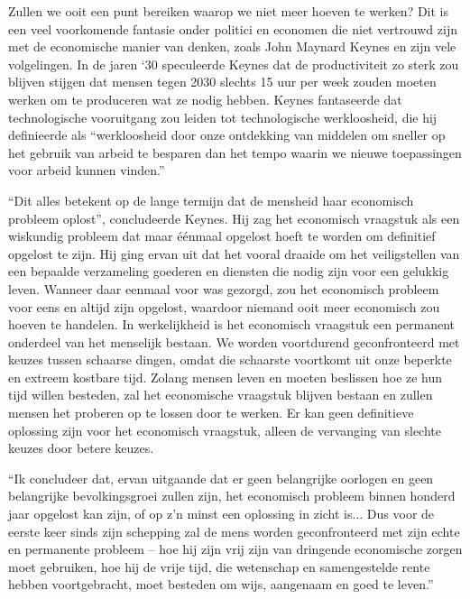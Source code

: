 Zullen we ooit een punt bereiken waarop we niet meer hoeven te werken?
Dit is een veel voorkomende fantasie onder politici en economen die niet
vertrouwd zijn met de economische manier van denken, zoals John Maynard
Keynes en zijn vele volgelingen. In de jaren `30 speculeerde Keynes dat
de productiviteit zo sterk zou blijven stijgen dat mensen tegen 2030
slechts 15 uur per week zouden moeten werken om te produceren wat ze
nodig hebben. Keynes fantaseerde dat technologische vooruitgang zou
leiden tot technologische werkloosheid, die hij definieerde als
\enquote{werkloosheid door onze ontdekking van middelen om sneller op het
gebruik van arbeid te besparen dan het tempo waarin we nieuwe
toepassingen voor arbeid kunnen vinden.}\autocite{43}

\enquote{Dit alles betekent op de lange termijn dat de mensheid haar economisch
probleem oplost}, concludeerde Keynes. Hij zag het economisch vraagstuk
als een wiskundig probleem dat maar éénmaal opgelost hoeft te worden om
definitief opgelost te zijn. Hij ging ervan uit dat het vooral draaide
om het veiligstellen van een bepaalde verzameling goederen en diensten
die nodig zijn voor een gelukkig leven. Wanneer daar eenmaal voor was
gezorgd, zou het economisch probleem voor eens en altijd zijn opgelost,
waardoor niemand ooit meer economisch zou hoeven te handelen. In
werkelijkheid is het economisch vraagstuk een permanent onderdeel van
het menselijk bestaan. We worden voortdurend geconfronteerd met keuzes
tussen schaarse dingen, omdat die schaarste voortkomt uit onze beperkte
en extreem kostbare tijd. Zolang mensen leven en moeten beslissen hoe ze
hun tijd willen besteden, zal het economische vraagstuk blijven bestaan
en zullen mensen het proberen op te lossen door te werken. Er kan geen
definitieve oplossing zijn voor het economisch vraagstuk, alleen de
vervanging van slechte keuzes door betere keuzes.

\enquote{Ik concludeer dat, ervan uitgaande dat er geen belangrijke oorlogen en
geen belangrijke bevolkingsgroei zullen zijn, het economisch probleem
binnen honderd jaar opgelost kan zijn, of op z'n minst
een oplossing in zicht is... Dus voor de eerste keer sinds zijn
schepping zal de mens worden geconfronteerd met zijn echte en permanente
probleem -- hoe hij zijn vrij zijn van dringende economische zorgen moet
gebruiken, hoe hij de vrije tijd, die wetenschap en samengestelde rente
hebben voortgebracht, moet besteden om wijs, aangenaam en goed te
leven.}\autocite{45}

